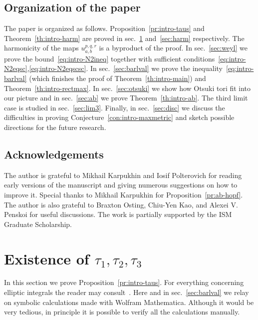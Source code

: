 \documentclass{amsart}
\theoremstyle{plain}
\theoremstyle{definition}
\theoremstyle{remark}
\begin{document}
\subsection{Organization of the paper}

The paper is organized as follows. Proposition~\ref{pr:intro-taus} and
Theorem~\ref{th:intro-harm} are proved in sec.~\ref{sec:taus} and~\ref{sec:harm}
respectively. The harmonicity of the maps \(u_{a,b}^{p,q,r}\) is a byproduct of
the proof. In sec.~\ref{sec:weyl} we prove the bound~\eqref{eq:intro-N2ineq}
together with sufficient
conditions~\eqref{eq:intro-N2eqsc},\eqref{eq:intro-N2eqscsc}. In
sec.~\ref{sec:barlval} we prove the inequality~\eqref{eq:intro-barlval} (which
finishes the proof of Theorem~\ref{th:intro-main}) and
Theorem~\ref{th:intro-rectmax}. In sec.~\ref{sec:otsuki} we show how Otsuki tori
fit into our picture and in sec.~\ref{sec:ab} we prove
Theorem~\ref{th:intro-ab}. The third limit case is studied in
sec.~\ref{sec:lim3}. Finally, in sec.~\ref{sec:disc} we discuss the difficulties
in proving Conjecture~\ref{con:intro-maxmetric} and sketch possible directions
for the future research.

\subsection*{Acknowledgements}

The author is grateful to Mikhail Karpukhin and Iosif Polterovich for reading
early versions of the manuscript and giving numerous suggestions on how to
improve it. Special thanks to Mikhail Karpukhin for
Proposition~\ref{pr:ab-hopf}. The author is also grateful to Braxton Osting,
Chiu-Yen Kao, and Alexei V.\,Penskoi for useful discussions. The work is
partially supported by the ISM Graduate Scholarship.

\section{Existence of \texorpdfstring{\(\tau_1,\tau_2,\tau_3\)}{τ₁, τ₂, τ₃}}
\label{sec:taus}

In this section we prove Proposition~\ref{pr:intro-taus}. For everything
concerning elliptic integrals the reader may consult~\cite{BF1971,Car2025,WR}.
Here and in sec.~\ref{sec:barlval} we relay on symbolic calculations made with
Wolfram Mathematica. Although it would be very tedious, in principle it is
possible to verify all the calculations manually.
\end{document}
